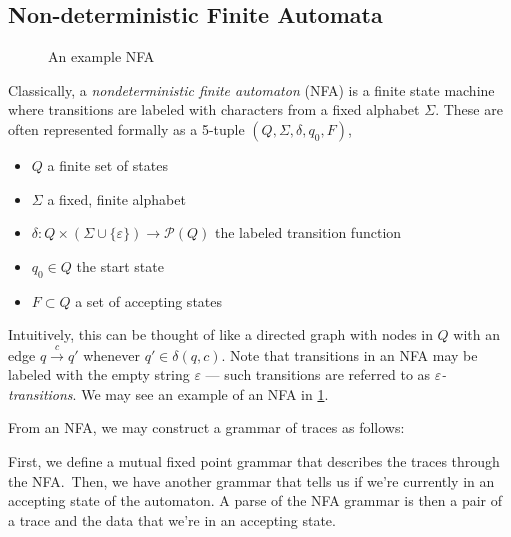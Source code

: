 \documentclass[acmsmall,screen,nonacm]{acmart}
\begin{document}
\subsection{Non-deterministic Finite Automata}
\label{subsec:finiteaut}
\begin{figure}
  \caption{An example NFA}
  \label{fig:NFA}
\end{figure}

Classically, a \emph{nondeterministic finite automaton} (NFA) is a finite state machine where
transitions are labeled with characters from a fixed alphabet $\Sigma$. These
are often represented formally as a 5-tuple $(Q, \Sigma, \delta, q_{0}, F)$,

\begin{itemize}
  \item $Q$ a finite set of states
  \item $\Sigma$ a fixed, finite alphabet
  \item $\delta : Q \times (\Sigma \cup \{ \varepsilon\}) \to \mathcal{P}(Q)$ the labeled transition function
  \item $q_{0} \in Q$ the start state
  \item $F \subset Q$ a set of accepting states
\end{itemize}

Intuitively, this can be thought of like a directed graph with nodes in $Q$ with
an edge $q \overset{c}{\to} q'$ whenever $q' \in \delta(q, c)$. Note that
transitions in an NFA may be labeled with the empty string $\varepsilon$ --- such
transitions are referred to as \emph{$\varepsilon$-transitions}. We may see an
example of an NFA in \cref{fig:NFA}.

From an NFA, we may construct a grammar of traces as follows:

First, we define a mutual fixed point grammar that describes the traces through the NFA.\ Then, we have another
grammar that tells us if we're currently in an accepting state of the automaton.
A parse of the NFA grammar is then a pair of a trace and the data that we're in
an accepting state.
\end{document}

